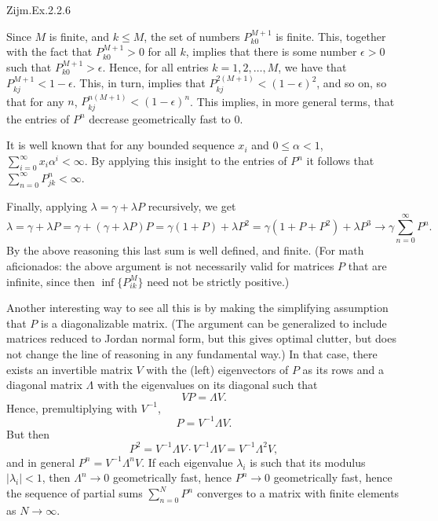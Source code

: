 \begin{exercise}[\faCalculator]
\label{ex:20}
Zijm.Ex.2.2.6
\begin{solution}
  Since $M$ is finite, and $k\leq M$, the set of numbers $P^{M+1}_{k0}$ is finite.
  This, together with the fact that $P^{M+1}_{k0}>0$ for all $k$, implies that there is some number $\epsilon>0$ such that $P^{M+1}_{k0}>\epsilon$.
  Hence, for all entries $k=1, 2, \ldots, M$, we have that $P^{M+1}_{kj} < 1- \epsilon$.
  This, in turn, implies that $P^{2(M+1)}_{kj} < (1- \epsilon)^2$, and so on, so that for any $n$, $P^{n(M+1)}_{kj} < (1- \epsilon)^n$.
  This implies, in more general terms, that the entries of $P^n$ decrease geometrically fast to $0$.

  It is well known that for any bounded sequence $x_i$ and $0\leq \alpha < 1$, $ \sum_{i=0}^\infty x_i \alpha^i < \infty$.
  By applying this insight to the entries of $P^n$ it follows that $\sum_{n=0}^\infty P^n_{jk} < \infty$.

Finally, applying $\lambda = \gamma + \lambda P$ recursively, we get
\begin{equation*}
  \lambda = \gamma + \lambda P = \gamma + (\gamma + \lambda P)P = \gamma (1+P) + \lambda P^2 = \gamma(1+P+P^2) + \lambda P^3 \to \gamma \sum_{n=0}^\infty P^n.
\end{equation*}
By the above reasoning this last sum is well defined, and finite.
(For math aficionados:  the above argument is not necessarily valid for matrices $P$ that are infinite, since then $\inf\{P^{M}_{ik}\}$ need not be strictly positive.)

Another interesting way to see all this is by making the simplifying assumption that $P$ is a diagonalizable matrix.
(The argument can be generalized to include matrices reduced to Jordan normal form, but this gives optimal clutter, but does not change the line of reasoning in any fundamental way.)
In that case, there exists an invertible matrix $V$ with the (left) eigenvectors of $P$ as its rows and a diagonal matrix $\Lambda$ with the eigenvalues on its diagonal such that
\begin{equation*}
  V P = \Lambda V.
\end{equation*}
Hence, premultiplying with $V^{-1}$, 
\begin{equation*}
  P = V^{-1}\Lambda V.
\end{equation*}
But then
\begin{equation*}
P^2 = V^{-1}\Lambda V \cdot V^{-1}\Lambda V= V^{-1}\Lambda^2 V,
\end{equation*}
and in general $P^n = V^{-1}\Lambda^n V$.
If each eigenvalue $\lambda_i$ is such that its modulus $|\lambda_i| < 1$, then $\Lambda^n \to 0$ geometrically fast, hence $P^n\to 0$ geometrically fast, hence the sequence of partial sums $\sum_{n=0}^N P^n$ converges to a matrix with finite elements as $N\to\infty$.


\end{solution}
\end{exercise}
